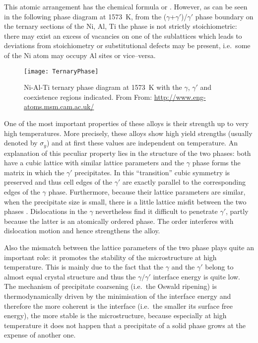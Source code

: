 This atomic arrangement has the chemical formula  or . However, as can be seen in the following phase diagram at \SI{1573}{K}, from the ($\gamma$+$\gamma'$)/$\gamma'$ phase boundary on the ternary sections of the Ni, Al, Ti  the phase is not strictly stoichiometric: there may exist an excess of vacancies on one of the sublattices which leads to deviations from stoichiometry or substitutional defects may be present, i.e.\ some of the Ni atom may occupy Al sites or vice--versa. 

\begin{figure}[t]
    \centering
    \texttt{[image: TernaryPhase]}
    \caption{Ni-Al-Ti ternary phase diagram at \SI{1573}{K} with the $\gamma$, $\gamma'$ and coexistence regions indicated. From From: {\ttfamily\url{http://www.eng-atoms.msm.cam.ac.uk/}}}
    \label{fig:Ni_phase}
\end{figure}

One of the most important properties of these alloys is their strength up to very high temperatures. More precisely, these alloys show high yield strengths (usually denoted by $\sigma_y$) and at first these values are independent on temperature. An explanation of this peculiar property lies in the structure of the two phases: both have a cubic lattice with similar lattice parameters and the $\gamma$ phase forms the matrix in which the $\gamma'$ precipitates. In this ``transition'' cubic symmetry is preserved and thus cell edges of the $\gamma'$ are exactly parallel to the corresponding edges of the $\gamma$ phase. Furthermore, because their lattice parameters are similar, when the precipitate size is small, there is a little lattice misfit between the two phases . Dislocations in the $\gamma$ nevertheless find it difficult to penetrate $\gamma'$, partly because the latter is an atomically ordered phase. The order interferes with dislocation motion and hence strengthens the alloy.

Also the mismatch between the lattice parameters of the two phase plays quite an important role: it promotes the stability of the microstructure at high temperature. This is mainly due to the fact that the $\gamma$ and the $\gamma'$ belong to almost equal crystal structure and thus the $\gamma/\gamma'$ interface energy is quite low. The mechanism of precipitate coarsening (i.e.\ the Oswald ripening) is thermodynamically driven by the minimisation of the interface energy and therefore the more coherent is the interface (i.e.\ the smaller its surface free energy), the more stable is the microstructure, because especially at high temperature it does not happen that a precipitate of a solid phase grows at the expense of another one.

